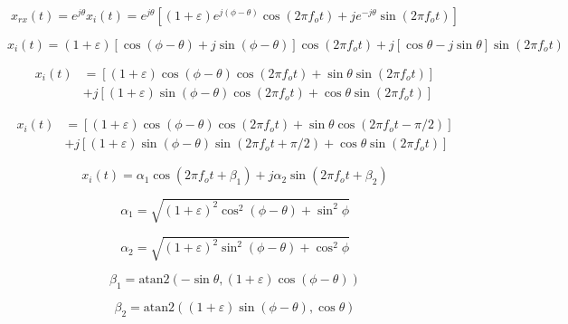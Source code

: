 \documentclass{article}
\begin{document}
\begin{equation}
	x_{rx}(t) = e^{j\theta}x_i(t) = e^{j\theta}\left[(1+\varepsilon)e^{j(\phi-\theta)}\cos(2{\pi}f_ot)+je^{-j\theta}\sin(2{\pi}f_ot)\right]
\end{equation}

\begin{equation}
	x_i(t) = (1+\varepsilon)[\cos(\phi-\theta)+j\sin(\phi-\theta)]\cos(2{\pi}f_ot)+j[\cos\theta-j\sin\theta]\sin(2{\pi}f_ot)
\end{equation}

\begin{equation}
\begin{split}
	x_i(t) &= \left[(1+\varepsilon)\cos(\phi-\theta)\cos(2{\pi}f_ot)+\sin\theta\sin(2{\pi}f_ot)\right]\\
	&+j\left[(1+\varepsilon)\sin(\phi-\theta)\cos(2{\pi}f_ot)+\cos\theta\sin(2{\pi}f_ot)\right]
\end{split}
\end{equation}

\begin{equation}
\begin{split}
	x_i(t) &= \left[(1+\varepsilon)\cos(\phi-\theta)\cos(2{\pi}f_ot)+\sin\theta\cos(2{\pi}f_ot-\pi/2)\right]\\
	&+j\left[(1+\varepsilon)\sin(\phi-\theta)\sin(2{\pi}f_ot+\pi/2)+\cos\theta\sin(2{\pi}f_ot)\right]
\end{split}
\end{equation}

\begin{equation}
	x_i(t) = \alpha_1\cos(2{\pi}f_ot+\beta_1)+j\alpha_2\sin(2{\pi}f_ot+\beta_2)
\end{equation}

\begin{equation}
	\alpha_1 = \sqrt{(1+\varepsilon)^2\cos^2(\phi-\theta)+\sin^2\phi}
\end{equation}

\begin{equation}
	\alpha_2 = \sqrt{(1+\varepsilon)^2\sin^2(\phi-\theta)+\cos^2\phi}
\end{equation}

\begin{equation}
	\beta_1 = \text{atan2}(-\sin\theta,(1+\varepsilon)\cos(\phi-\theta))
\end{equation}

\begin{equation}
	\beta_2 = \text{atan2}((1+\varepsilon)\sin(\phi-\theta),\cos\theta)
\end{equation}
\end{document}
